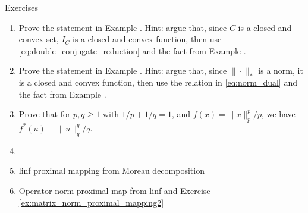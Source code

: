 \begin{xcb}{Exercises}
\begin{enumerate}[label=\thechapter.\arabic*]
\item \label{ex:support_function_conjugate}
  Prove the statement in Example . Hint:
  argue that, since $C$ is a closed and convex set, $I_C$ is a closed and convex
  function, then use \eqref{eq:double_conjugate_reduction} and the fact from 
  Example . 

\item \label{ex:norm_conjugate}
  Prove the statement in Example . Hint: argue that,
  since $\|\cdot\|_*$ is a norm, it is a closed and convex function, then use
  the relation in \eqref{eq:norm_dual} and the fact from Example 
  .  
 
\item Prove that for $p,q \geq 1$ with $1/p + 1/q = 1$, and $f(x) =
  \|x\|_p^p/p$, we have $f^*(u) = \|u\|_q^q/q$.  

\item \label{ex:conjugates_smoothness}

\item linf proximal mapping from Moreau decomposition

\item Operator norm proximal map from linf and Exercise
  \ref{ex:matrix_norm_proximal_mapping2}   

\end{enumerate}
\end{xcb}
